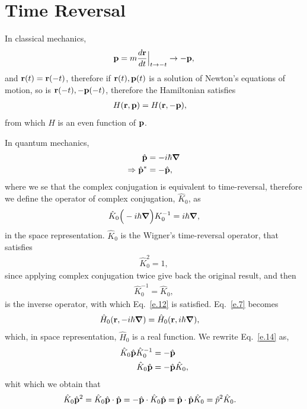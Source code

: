 \documentclass[floatfix,prb,aps,superscriptaddress,11pt]{revtex4}
\begin{document}
\section{Time Reversal}\label{sec:tr}
In classical mechanics,
\begin{align}\label{e.6}
\mathbf{p}=m\frac{d\mathbf{r}}{dt}\Big|_{t\to -t}\to -\mathbf{p} 
,
\end{align} 
and
$\mathbf{r}(t)=\mathbf{r}(-t)$, 
therefore if $\mathbf{r}(t),\mathbf{p}(t)$ is a solution of Newton's equations of motion, so 
is $\mathbf{r}(-t),-\mathbf{p}(-t)$, therefore the Hamiltonian satisfies
\begin{align}\label{e.7}  
H(\mathbf{r},\mathbf{p})&=H(\mathbf{r},-\mathbf{p}) 
,
\end{align}  
from which $H$ is an even function of $\mathbf{p}$.

In quantum mechanics,
\begin{align}\label{e.8}
\hat{\mathbf{p}} &=-i\hbar\boldsymbol{\nabla} 
\nonumber\\
\Rightarrow \hat{\mathbf{p}}^* &=-\hat{\mathbf{p}},
\end{align}
where we se that the complex conjugation is equivalent to 
time-reversal, therefore we define the operator of complex conjugation, $\hat K_0$, as 
\begin{align}\label{e.9}
\hat K_0\Big(-i\hbar\boldsymbol{\nabla}\Big)K^{-1}_0=i\hbar\boldsymbol{\nabla}  
,
\end{align}  
in the space representation. $\hat K_0$ is the Wigner's time-reversal 
operator, that satisfies
\begin{align}\label{e.12}
\hat K^2_0=1  
,
\end{align} 
since applying complex conjugation twice give back the original
result, and then 
\begin{align}\label{e.13}
\hat K^{-1}_0=\hat K_0 
,
\end{align}
is the inverse operator, with which Eq.~\eqref{e.12} is satisfied.
Eq.~\eqref{e.7} becomes
\begin{align}\label{e.10} 
\hat H_0(\mathbf{r},-i\hbar\boldsymbol{\nabla} )&=\hat H_0(\mathbf{r},i\hbar\boldsymbol{\nabla} ) 
,
\end{align} 
which, in space representation, $\hat H_0$ is a real function. 
We rewrite Eq.~\eqref{e.14} as,
\begin{align}\label{e.11}
\hat K_0\hat{\mathbf{p}} \hat K^{-1}_0&=-\hat{\mathbf{p}} 
\nonumber\\
\hat K_0\hat{\mathbf{p}} 
&=-\hat{\mathbf{p}} \hat K_0  
,
\end{align}  
whit which we obtain that
\begin{align}\label{e.11n}
\hat K_0\hat{\mathbf{p}}^2
&=
\hat K_0 
\hat{\mathbf{p}}\cdot \hat{\mathbf{p}}
=-\hat{\mathbf{p}}\cdot \hat K_0 \hat{\mathbf{p}}
=\hat{\mathbf{p}}\cdot \hat{\mathbf{p}}\hat K_0 
=\hat p^2\hat K_0 
.
\end{align} 
\end{document}
